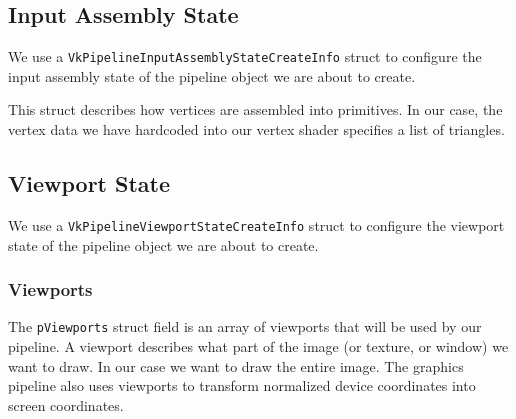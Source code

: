 \subsection{Input Assembly State}

We use a \texttt{VkPipelineInputAssemblyStateCreateInfo} struct to configure the
input assembly state of the pipeline object we are about to create.

This struct describes how vertices are assembled into primitives.
In our case, the vertex data we have hardcoded into our vertex shader specifies
a list of triangles.

\begin{minipage}{\linewidth}{\noindent}
    
\end{minipage}

\subsection{Viewport State}

We use a \texttt{VkPipelineViewportStateCreateInfo} struct to configure
the viewport state of the pipeline object we are about to create.

\begin{minipage}{\linewidth}{\noindent}
    
\end{minipage}

\subsubsection{Viewports}

The \texttt{pViewports} struct field
is an array of viewports that will be used by our pipeline.
A viewport describes what part of the image (or texture, or window) we want to draw.
In our case we want to draw the entire image.
The graphics pipeline also uses viewports to transform normalized device
coordinates into screen coordinates.

\begin{minipage}{\linewidth}{\noindent}
    
\end{minipage}

